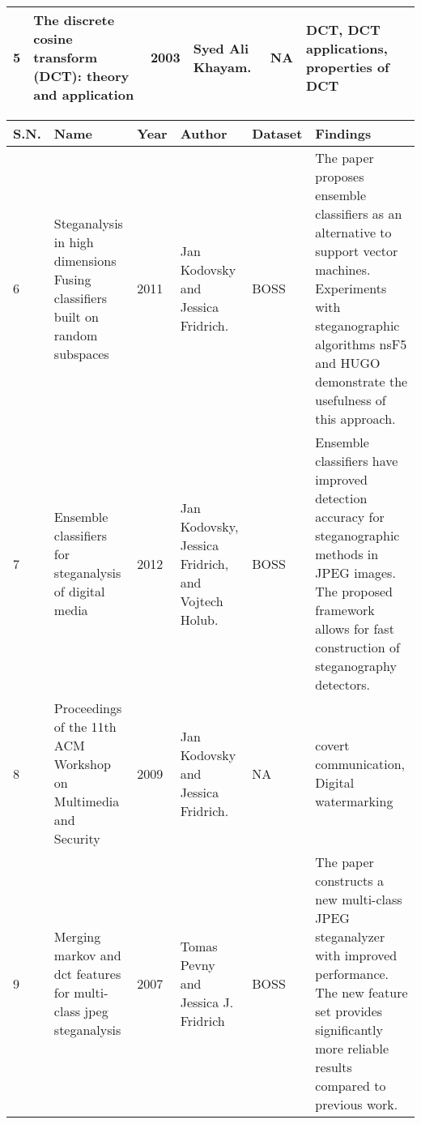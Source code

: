 \begin{table}[!h]
\begin{tabular}{|p{0.7cm}|p{3cm}|p{0.8cm}|p{3cm}|p{1.3cm}|p{3cm}|}
        5    & The discrete cosine transform (DCT): theory and application\cite{4}                       & 2003 & Syed Ali   Khayam.                                                                     & NA               & DCT, DCT applications, properties of DCT                                                                                                                                                                                                \\\hline

        \end{tabular}
\end{table}
\clearpage
\begin{table}[!h]
    \begin{tabular}{|p{0.7cm}|p{3cm}|p{0.8cm}|p{3cm}|p{1.3cm}|p{3cm}|}
        \hline
    S.N. & Name                                                                            & Year & Author                                                                                 & Dataset          & Findings                                                                                                                                                                                          \\\hline
    6    & Steganalysis in high dimensions Fusing classifiers built on random subspaces\cite{8}     & 2011 & Jan Kodovsky and Jessica Fridrich.                                                     & BOSS             & The paper proposes ensemble classifiers as an alternative   to support vector machines. Experiments with steganographic algorithms nsF5   and HUGO demonstrate the usefulness of this approach.   \\\hline
    7    & Ensemble classifiers for steganalysis of digital media\cite{5}                           & 2012 & Jan Kodovsky, Jessica Fridrich, and Vojtech Holub.                                     & BOSS             & Ensemble classifiers have improved detection accuracy for steganographic methods in JPEG images. The proposed framework allows for fast construction of steganography detectors.                  \\\hline
    8    & Proceedings of the 11th ACM Workshop on Multimedia and Security\cite{9}                  & 2009 & Jan Kodovsky and Jessica Fridrich.                                                     & NA            &  covert communication, Digital watermarking                                                                                                                                                                                                 \\\hline
        9    & Merging markov and dct features for multi-class jpeg steganalysis\cite{11}                & 2007 & Tomas Pevny and   Jessica J. Fridrich                                                  & BOSS             & The paper   constructs a new multi-class JPEG steganalyzer with improved performance. The   new feature set provides significantly more reliable results compared to   previous work.             \\\hline
    \end{tabular}
\end{table} 
